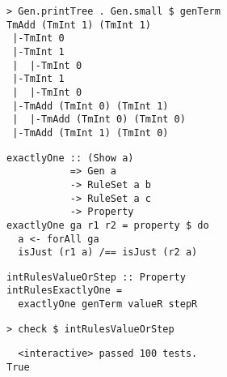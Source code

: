 \begin{frame}[fragile]
  \begin{verbatim}
> Gen.printTree . Gen.small $ genTerm
TmAdd (TmInt 1) (TmInt 1)
 |-TmInt 0
 |-TmInt 1
 |  |-TmInt 0
 |-TmInt 1
 |  |-TmInt 0
 |-TmAdd (TmInt 0) (TmInt 1)
 |  |-TmAdd (TmInt 0) (TmInt 0)
 |-TmAdd (TmInt 1) (TmInt 0)
  \end{verbatim}
\end{frame}

\begin{frame}[fragile]
  \begin{verbatim}
exactlyOne :: (Show a)
           => Gen a
           -> RuleSet a b
           -> RuleSet a c
           -> Property
exactlyOne ga r1 r2 = property $ do
  a <- forAll ga
  isJust (r1 a) /== isJust (r2 a)
  \end{verbatim}
\end{frame}

\begin{frame}[fragile]
  \begin{verbatim}
intRulesValueOrStep :: Property
intRulesExactlyOne =
  exactlyOne genTerm valueR stepR
  \end{verbatim}
\end{frame}

\begin{frame}[fragile]
  \begin{verbatim}
> check $ intRulesValueOrStep
  \end{verbatim}
  \begin{verbatim}
  <interactive> passed 100 tests.
True
  \end{verbatim}
\end{frame}
